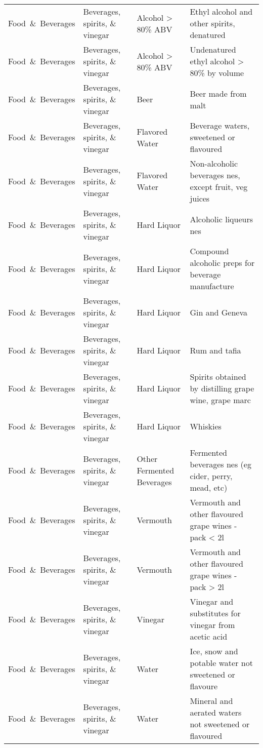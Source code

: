 \begin{appendices}
\begin{xltabular}{\textwidth}{|p{0.10\textwidth}|p{0.30\textwidth}|p{0.20\textwidth}|p{0.30\textwidth}|}
		Food\ \&\ Beverages & Beverages, spirits, \& vinegar & Alcohol > 80\% ABV & Ethyl alcohol and other spirits, denatured \\
		Food\ \&\ Beverages & Beverages, spirits, \& vinegar & Alcohol > 80\% ABV & Undenatured ethyl alcohol > 80\% by volume \\
		Food\ \&\ Beverages & Beverages, spirits, \& vinegar & Beer & Beer made from malt \\
		Food\ \&\ Beverages & Beverages, spirits, \& vinegar & Flavored Water & Beverage waters, sweetened or flavoured \\
		Food\ \&\ Beverages & Beverages, spirits, \& vinegar & Flavored Water & Non-alcoholic beverages nes, except fruit, veg juices \\
		Food\ \&\ Beverages & Beverages, spirits, \& vinegar & Hard Liquor & Alcoholic liqueurs nes \\
		Food\ \&\ Beverages & Beverages, spirits, \& vinegar & Hard Liquor & Compound alcoholic preps for beverage manufacture \\
		Food\ \&\ Beverages & Beverages, spirits, \& vinegar & Hard Liquor & Gin and Geneva \\
		Food\ \&\ Beverages & Beverages, spirits, \& vinegar & Hard Liquor & Rum and tafia \\
		Food\ \&\ Beverages & Beverages, spirits, \& vinegar & Hard Liquor & Spirits obtained by distilling grape wine, grape marc \\
		Food\ \&\ Beverages & Beverages, spirits, \& vinegar & Hard Liquor & Whiskies \\
		Food\ \&\ Beverages & Beverages, spirits, \& vinegar & Other Fermented Beverages & Fermented beverages nes (eg cider, perry, mead, etc) \\
		Food\ \&\ Beverages & Beverages, spirits, \& vinegar & Vermouth & Vermouth and other flavoured grape wines - pack < 2l \\
		Food\ \&\ Beverages & Beverages, spirits, \& vinegar & Vermouth & Vermouth and other flavoured grape wines - pack > 2l \\
		Food\ \&\ Beverages & Beverages, spirits, \& vinegar & Vinegar & Vinegar and substitutes for vinegar from acetic acid \\
		Food\ \&\ Beverages & Beverages, spirits, \& vinegar & Water & Ice, snow and potable water not sweetened or flavoure \\
		Food\ \&\ Beverages & Beverages, spirits, \& vinegar & Water & Mineral and aerated waters not sweetened or flavoured \\

\end{xltabular}
\end{appendices}
